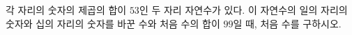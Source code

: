 각 자리의 숫자의 제곱의 합이 $53$인 두 자리 자연수가 있다. 이 자연수의 일의 자리의 숫자와 십의 자리의 숫자를 바꾼 수와 처음 수의 합이 $99$일 때, 처음 수를 구하시오. 
